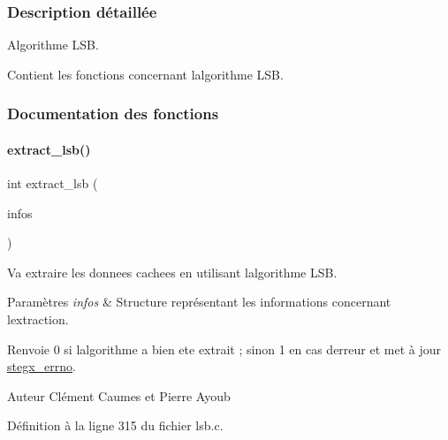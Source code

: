 \subsubsection{Description détaillée}
Algorithme L\+SB. 

Contient les fonctions concernant l\textquotesingle{}algorithme L\+SB. 

\subsubsection{Documentation des fonctions}
\mbox{\label{a00035_abc757e2627fc9971e388a584e0e0c2ca}} 
\paragraph{\texorpdfstring{extract\+\_\+lsb()}{extract\_lsb()}}
{\footnotesize\ttfamily int extract\+\_\+lsb (\begin{DoxyParamCaption}\item[{\hyperlink{a00008_aa8ca908d92fb5bdd3c0a9e1f58b2cf03}{info\+\_\+s} $\ast$}]{infos }\end{DoxyParamCaption})}



Va extraire les donnees cachees en utilisant l\textquotesingle{}algorithme L\+SB. 


\begin{DoxyParams}{Paramètres}
{\em infos} & Structure représentant les informations concernant l\textquotesingle{}extraction. \\
\hline
\end{DoxyParams}
\begin{DoxyReturn}{Renvoie}
0 si l\textquotesingle{}algorithme a bien ete extrait ; sinon 1 en cas d\textquotesingle{}erreur et met à jour \hyperlink{a00062_a5ec48ccdfbe19fe23855818f8556abec}{stegx\+\_\+errno}. 
\end{DoxyReturn}
\begin{DoxyAuthor}{Auteur}
Clément Caumes et Pierre Ayoub 
\end{DoxyAuthor}


Définition à la ligne 315 du fichier lsb.\+c.

